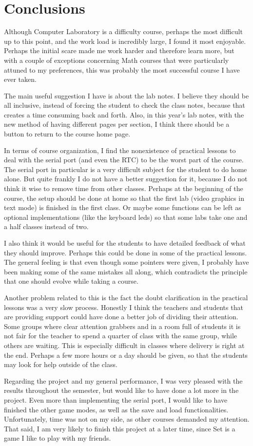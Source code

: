 \documentclass[11pt,a4paper,reqno]{report}
\numberwithin{equation}{section}
\begin{document}
\chapter{Conclusions}

Although Computer Laboratory is a difficulty course, perhaps the most difficult up to this point, and the work load is incredibly large, I found it most enjoyable. Perhaps the initial scare made me work harder and therefore learn more, but with a couple of exceptions concerning Math courses that were particularly attuned to my preferences, this was probably the most successful course I have ever taken.

The main useful suggestion I have is about the lab notes. I believe they should be all inclusive, instead of forcing the student to check the class notes, because that creates a time consuming back and forth. Also, in this year's lab notes, with the new method of having different pages per section, I think there should be a button to return to the course home page.

In terms of course organization, I find the nonexistence of practical lessons to deal with the serial port (and even the RTC) to be the worst part of the course. The serial port in particular is a very difficult subject for the student to do home alone. But quite frankly I do not have a better suggestion for it, because I do not think it wise to remove time from other classes. Perhaps at the beginning of the course, the setup should be done at home so that the first lab (video graphics in text mode) is finished in the first class. Or maybe some functions can be left as optional implementations (like the keyboard leds) so that some labs take one and a half classes instead of two.

I also think it would be useful for the students to have detailed feedback of what they should improve. Perhaps this could be done in some of the practical lessons. The general feeling is that even though some pointers were given, I probably have been making some of the same mistakes all along, which contradicts the principle that one should evolve while taking a course.

Another problem related to this is the fact the doubt clarification in the practical lessons was a very slow process. Honestly I think the teachers and students that are providing support could have done a better job of dividing their attention. Some groups where clear attention grabbers and in a room full of students it is not fair for the teacher to spend a quarter of class with the same group, while others are waiting. This is especially difficult in classes where delivery is right at the end. Perhaps a few more hours or a day should be given, so that the students may look for help outside of the class.

Regarding the project and my general performance, I was very pleased with the results throughout the semester, but would like to have done a lot more in the project. Even more than implementing the serial port, I would like to have finished the other game modes, as well as the save and load functionalities. Unfortunately, time was not on my side, as other courses demanded my attention. That said, I am very likely to finish this project at a later time, since Set is a game I like to play with my friends.
\end{document}
